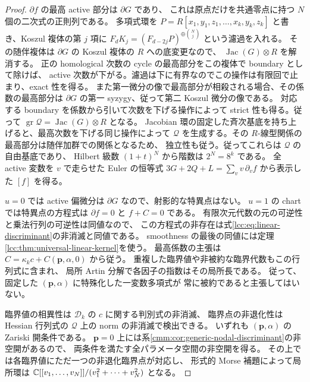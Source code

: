 \begin{proof}
$\partial f$ の最高 active 部分は $\partial G$ であり、
これは原点だけを共通零点に持つ $N$ 個の二次式の正則列である。
多項式環を $P=R[x_1,y_1,z_1,\ldots,x_k,y_k,z_k]$ と書き、Koszul 複体の第 $j$ 項に
$F_dK_j=(F_{d-2j}P)^{\oplus\binom Nj}$ という濾過を入れる。
その随伴複体は $\partial G$ の Koszul 複体の $R$ への底変更なので、
$\operatorname{Jac}(G)\otimes R$ を解消する。
正の homological 次数の cycle の最高部分をこの複体で boundary として除けば、
active 次数が下がる。濾過は下に有界なのでこの操作は有限回で止まり、exact 性を得る。
また第一微分の像で最高部分が相殺される場合、その係数の最高部分は
$\partial G$ の第一 syzygy、従って第二 Koszul 微分の像である。
対応する boundary を係数から引いて次数を下げる操作によって strict 性も得る。従って
$\operatorname{gr}\mathcal Q=\operatorname{Jac}(G)\otimes R$ となる。
Jacobian 環の固定した斉次基底を持ち上げると、最高次数を下げる同じ操作によって
$\mathcal Q$ を生成する。その $R$-線型関係の最高部分は随伴加群での関係となるため、
独立性も従う。従ってこれらは $\mathcal Q$ の自由基底であり、
Hilbert 級数 $(1+t)^N$ から階数は $2^N=8^k$ である。
全 active 変数を $v$ で走らせた Euler の恒等式
$3G+2Q+L=\sum_v v\,\partial_v f$ から表示した $[f]$ を得る。

$u=0$ では active 偏微分は $\partial G$ なので、射影的な特異点はない。
$u=1$ の chart では特異点の方程式は $\partial f=0$ と $f+C=0$ である。
有限次元代数の元の可逆性と乗法行列の可逆性は同値なので、
この方程式の非存在は式\eqref{lcc:eq:linear-discriminant}の非消滅と同値である。
smoothness の最後の同値には定理\ref{lcc:thm:universal-linear-kernel}を使う。
最高係数の主張は $C=\kappa_kc+C(\mathbf p,\alpha,0)$ から従う。
重複した臨界値や非被約な臨界代数もこの行列式に含まれ、
局所 Artin 分解で各因子の指数はその局所長である。
従って、固定した $(\mathbf p,\alpha)$ に特殊化した一変数多項式が
常に被約であると主張してはいない。

臨界値の相異性は $\mathscr D_k$ の $c$ に関する判別式の非消滅、
臨界点の非退化性は Hessian 行列式の $\mathcal Q$ 上の norm の非消滅で検出できる。
いずれも $(\mathbf p,\alpha)$ の Zariski 開条件である。
$\mathbf p=0$ 上には系\ref{cmm:cor:generic-nodal-discriminant}の非空開があるので、
両条件を満たす全パラメータ空間の非空開を得る。
その上では各臨界値にただ一つの非退化臨界点が対応し、
形式的 Morse 補題によって局所環は
$\mathbb C[[v_1,\ldots,v_N]]/(v_1^2+\cdots+v_N^2)$ となる。
\end{proof}



